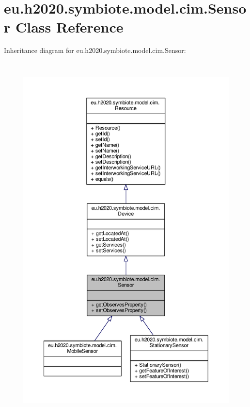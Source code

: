 \hypertarget{classeu_1_1h2020_1_1symbiote_1_1model_1_1cim_1_1Sensor}{}\section{eu.\+h2020.\+symbiote.\+model.\+cim.\+Sensor Class Reference}
\label{classeu_1_1h2020_1_1symbiote_1_1model_1_1cim_1_1Sensor}


Inheritance diagram for eu.\+h2020.\+symbiote.\+model.\+cim.\+Sensor\+:
\nopagebreak
\begin{figure}[H]
\begin{center}
\leavevmode
\includegraphics[height=550pt]{classeu_1_1h2020_1_1symbiote_1_1model_1_1cim_1_1Sensor__inherit__graph}
\end{center}
\end{figure}


